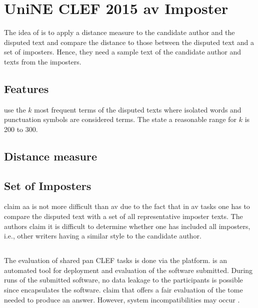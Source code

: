 \section{UniNE CLEF 2015 \ac{av} Imposter}
\label{sec:UniNE_CLEF2015_AV_imposter}

The idea of \cite{kocher_unine_2015} is to apply a distance measure to the candidate author and the disputed text and 
compare the distance to those between the disputed text and a set of imposters.
Hence, they need a sample text of the candidate author and texts from the imposters.

\subsection{Features}

\citet{kocher_unine_2015} use the $k$ most frequent terms of the disputed texts where isolated words and punctuation symbols are considered terms.
The state a reasonable range for $k$ is 200 to 300.


\subsection{Distance measure}


\subsection{Set of Imposters}

\citet{kocher_unine_2015} claim \ac{aa} is not more difficult than \ac{av} 
due to the fact that in \ac{av} tasks one has to compare the disputed text with a set of all representative imposter texts.
The authors claim it is difficult to determine whether one has included all imposters, 
i.e., other writers having a similar style to the candidate author.

\subsection{\tira{}}
\label{sec:tira}

The evaluation of shared \ac{pan} CLEF tasks is done via the \tira{} platform.
\tira{} is an automated tool for deployment and evaluation of the software submitted.
During runs of the submitted software, no data leakage to the participants is possible since \tira{} encapsulates the software.
\citet{kocher_unine_2015} claim that \tira{} offers a fair evaluation of the tome needed to produce an answer.
However, system incompatibilities may occur \cite{kocher_unine_2015}.

